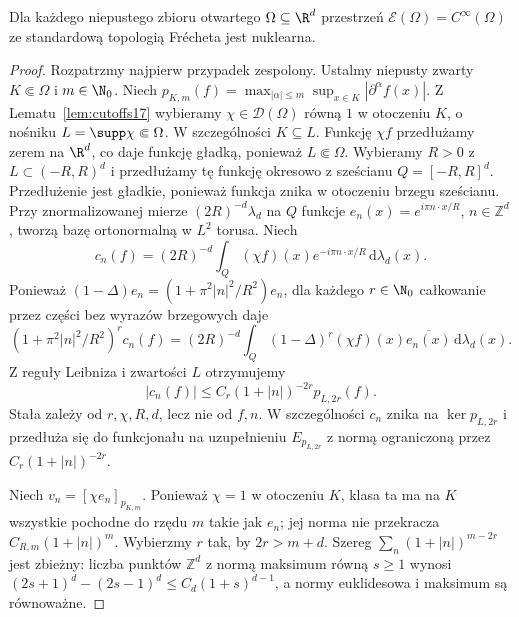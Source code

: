 \begin{twierdzenie}
\label{thm:nuclear-cinfty23}
Dla każdego niepustego zbioru otwartego $\Omega\subseteq\R^d$
przestrzeń $\mathcal E(\Omega)=C^\infty(\Omega)$
ze standardową topologią Frécheta jest nuklearna.
\end{twierdzenie}
\begin{proof}
Rozpatrzmy najpierw przypadek zespolony. Ustalmy
niepusty zwarty $K\Subset\Omega$ i $m\in\N_0$.
Niech $p_{K,m}(f)=\max_{|\alpha|\le m}\sup_{x\in K}
|\partial^\alpha f(x)|$. Z Lematu~\ref{lem:cutoffs17}
wybieramy $\chi\in\mathcal D(\Omega)$ równą $1$
w otoczeniu $K$, o nośniku $L=\supp\chi\Subset\Omega$.
W szczególności $K\subseteq L$. Funkcję $\chi f$
przedłużamy zerem na $\R^d$, co daje funkcję gładką,
ponieważ $L\Subset\Omega$.
Wybieramy $R>0$ z $L\subset(-R,R)^d$ i przedłużamy
tę funkcję okresowo z sześcianu $Q=[-R,R]^d$.
Przedłużenie jest gładkie, ponieważ funkcja znika
w otoczeniu brzegu sześcianu.
Przy znormalizowanej mierze $(2R)^{-d}\lambda_d$
na $Q$ funkcje $e_n(x)=e^{i\pi n\cdot x/R}$,
$n\in\mathbb Z^d$, tworzą bazę ortonormalną w $L^2$
torusa. Niech
\[
 c_n(f)=(2R)^{-d}\int_Q(\chi f)(x)
 e^{-i\pi n\cdot x/R}\,\mathrm d\lambda_d(x).
\]
Ponieważ $(1-\Delta)e_n=(1+\pi^2|n|^2/R^2)e_n$,
dla każdego $r\in\N_0$ całkowanie przez części
bez wyrazów brzegowych daje
\[
 (1+\pi^2|n|^2/R^2)^r c_n(f)
 =(2R)^{-d}\int_Q (1-\Delta)^r(\chi f)(x)
 \overline{e_n(x)}\,\mathrm d\lambda_d(x).
\]
Z reguły Leibniza i zwartości $L$ otrzymujemy
\[
 |c_n(f)|\le C_r(1+|n|)^{-2r}p_{L,2r}(f).
\]
Stała zależy od $r,\chi,R,d$, lecz nie od $f,n$.
W szczególności $c_n$ znika na $\ker p_{L,2r}$
i przedłuża się do funkcjonału na uzupełnieniu
$E_{p_{L,2r}}$ z normą ograniczoną przez
$C_r(1+|n|)^{-2r}$.

Niech $v_n=[\chi e_n]_{p_{K,m}}$.
Ponieważ $\chi=1$ w otoczeniu $K$, klasa ta ma
na $K$ wszystkie pochodne do rzędu $m$ takie jak $e_n$;
jej norma nie przekracza $C_{R,m}(1+|n|)^m$.
Wybierzmy $r$ tak, by $2r>m+d$.
Szereg $\sum_n (1+|n|)^{m-2r}$ jest zbieżny:
liczba punktów $\mathbb Z^d$ z normą maksimum równą
$s\ge1$ wynosi $(2s+1)^d-(2s-1)^d
\le C_d(1+s)^{d-1}$, a normy euklidesowa i maksimum
są równoważne.


\end{proof}
